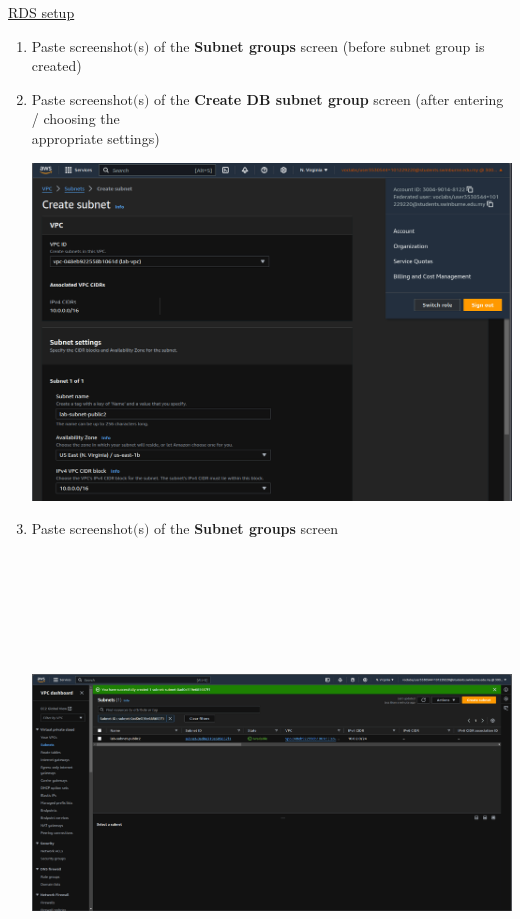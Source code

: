\documentclass[11pt]{article}
\begin{document}
\newpage
\noindent\underline{RDS setup}    
\begin{enumerate}[resume]
    \item Paste screenshot$($s$)$ of the \textbf{Subnet groups} screen (before subnet group is created) \\
    
    \vspace{2mm}
    
    \item Paste screenshot$($s$)$ of the \textbf{Create DB subnet group} screen (after entering / choosing the \\ appropriate settings) \\
    \vspace{2mm}

    {\centering
    \includegraphics[width=5.8in]{pics/5_a.png}
    }

    
    \item Paste screenshot$($s$)$ of the \textbf{Subnet groups} screen \\
    \vspace{2mm}

    {\centering
    \includegraphics[width=5.8in, height=5.0in]{pics/6.png}
    }
    

\end{enumerate}
\end{document}
